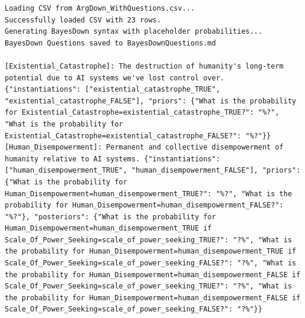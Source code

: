 \documentclass[
  11pt,
  letterpaper,
]{book}
\begin{document}
\begin{verbatim}
Loading CSV from ArgDown_WithQuestions.csv...
Successfully loaded CSV with 23 rows.
Generating BayesDown syntax with placeholder probabilities...
BayesDown Questions saved to BayesDownQuestions.md

[Existential_Catastrophe]: The destruction of humanity's long-term potential due to AI systems we've lost control over. {"instantiations": ["existential_catastrophe_TRUE", "existential_catastrophe_FALSE"], "priors": {"What is the probability for Existential_Catastrophe=existential_catastrophe_TRUE?": "%?", "What is the probability for Existential_Catastrophe=existential_catastrophe_FALSE?": "%?"}}
[Human_Disempowerment]: Permanent and collective disempowerment of humanity relative to AI systems. {"instantiations": ["human_disempowerment_TRUE", "human_disempowerment_FALSE"], "priors": {"What is the probability for Human_Disempowerment=human_disempowerment_TRUE?": "%?", "What is the probability for Human_Disempowerment=human_disempowerment_FALSE?": "%?"}, "posteriors": {"What is the probability for Human_Disempowerment=human_disempowerment_TRUE if Scale_Of_Power_Seeking=scale_of_power_seeking_TRUE?": "?%", "What is the probability for Human_Disempowerment=human_disempowerment_TRUE if Scale_Of_Power_Seeking=scale_of_power_seeking_FALSE?": "?%", "What is the probability for Human_Disempowerment=human_disempowerment_FALSE if Scale_Of_Power_Seeking=scale_of_power_seeking_TRUE?": "?%", "What is the probability for Human_Disempowerment=human_disempowerment_FALSE if Scale_Of_Power_Seeking=scale_of_power_seeking_FALSE?": "?%"}}

\end{verbatim}
\end{document}
